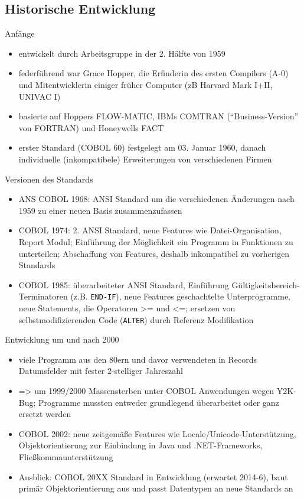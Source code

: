 \documentclass[handout]{beamer}
\begin{document}
\subsection{Historische Entwicklung}
\begin{frame}{Anfänge}
	\begin{itemize}[<+->]
		\item
			entwickelt durch Arbeitsgruppe in der 2. H\"alfte von 1959
		\item
			federführend war Grace Hopper, die Erfinderin des ersten Compilers (A-0) und Mitentwicklerin einiger fr\"uher Computer (zB Harvard Mark I+II, UNIVAC I)
		\item
			basierte auf Hoppers FLOW-MATIC, IBMs COMTRAN (``Business-Version'' von FORTRAN) und Honeywells FACT
		\item
		erster Standard (COBOL 60) festgelegt am 03. Januar 1960, danach individuelle (inkompatibele) Erweiterungen von verschiedenen Firmen
	\end{itemize}
\end{frame}

\begin{frame}{Versionen des Standards}
	\begin{itemize}[<+->]
		\item
			ANS COBOL 1968: ANSI Standard um die verschiedenen \"Anderungen nach 1959 zu einer neuen Basis zusammenzufassen
		\item
			COBOL 1974: 2. ANSI Standard, neue Features wie Datei-Organisation, Report Modul; Einführung der Möglichkeit ein Programm in Funktionen zu unterteilen; Abschaffung von Features, deshalb inkompatibel zu vorherigen Standards
		\item
			COBOL 1985: \"uberarbeiteter ANSI Standard, Einf\"uhrung G\"ultigkeitsbereich-Terminatoren (z.B. \texttt{END-IF}), neue Features geschachtelte Unterprogramme, neue Statements, die Operatoren >= und <=; ersetzen von selbstmodifizierenden Code (\texttt{ALTER}) durch Referenz Modifikation
	\end{itemize}
\end{frame}

\begin{frame}{Entwicklung um und nach 2000}
	\begin{itemize}[<+->]
		\item
			viele Programm aus den 80ern und davor verwendeten in Records Datumsfelder mit fester 2-stelliger Jahreszahl
		\item
			=> um 1999/2000 Massensterben unter COBOL Anwendungen wegen Y2K-Bug; Programme mussten entweder grundlegend überarbeitet oder ganz ersetzt werden
		\item
			COBOL 2002: neue zeitgemäße Features wie Locale/Unicode-Unterstützung, Objektorientierung zur Einbindung in Java und .NET-Frameworks, Fließkommaunterstützung
		\item
			Ausblick: COBOL 20XX Standard in Entwicklung (erwartet 2014-6), baut primär Objektorientierung aus und passt Datentypen an neue Standards an
		\end{itemize}
\end{frame}
\end{document}
